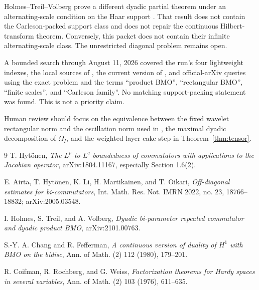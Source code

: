 \documentclass[11pt]{article}
\begin{document}
Holmes--Treil--Volberg prove a different dyadic partial theorem under an
alternating-scale condition on the Haar support \cite{HTV}.  That result does
not contain the Carleson-packed support class and does not repair the
continuous Hilbert-transform theorem.  Conversely, this packet does not
contain their infinite alternating-scale class.  The unrestricted diagonal
problem remains open.

A bounded search through August 11, 2026 covered the run's four lightweight
indexes, the local sources of \cite{Hy,HTV}, the current version of
\cite{AHLMO}, and official-arXiv queries using the exact problem and the terms
``product BMO'', ``rectangular BMO'', ``finite scales'', and ``Carleson
family''.  No matching support-packing statement was found.  This is not a
priority claim.

Human review should focus on the equivalence between the fixed wavelet
rectangular norm and the oscillation norm used in \cite{AHLMO}, the maximal
dyadic decomposition of $\Omega_I$, and the weighted layer-cake step in
Theorem~\ref{thm:tensor}.

\small
\begin{thebibliography}{9}
T. Hytönen,
\emph{The $L^p$-to-$L^q$ boundedness of commutators with applications to the
Jacobian operator}, arXiv:1804.11167, especially Section 1.6(2).

E. Airta, T. Hytönen, K. Li, H. Martikainen, and T. Oikari,
\emph{Off-diagonal estimates for bi-commutators},
Int. Math. Res. Not. IMRN 2022, no. 23, 18766--18832;
arXiv:2005.03548.

I. Holmes, S. Treil, and A. Volberg,
\emph{Dyadic bi-parameter repeated commutator and dyadic product BMO},
arXiv:2101.00763.

S.-Y. A. Chang and R. Fefferman,
\emph{A continuous version of duality of $H^1$ with BMO on the bidisc},
Ann. of Math. (2) 112 (1980), 179--201.

R. Coifman, R. Rochberg, and G. Weiss,
\emph{Factorization theorems for Hardy spaces in several variables},
Ann. of Math. (2) 103 (1976), 611--635.
\end{thebibliography}
\end{document}
